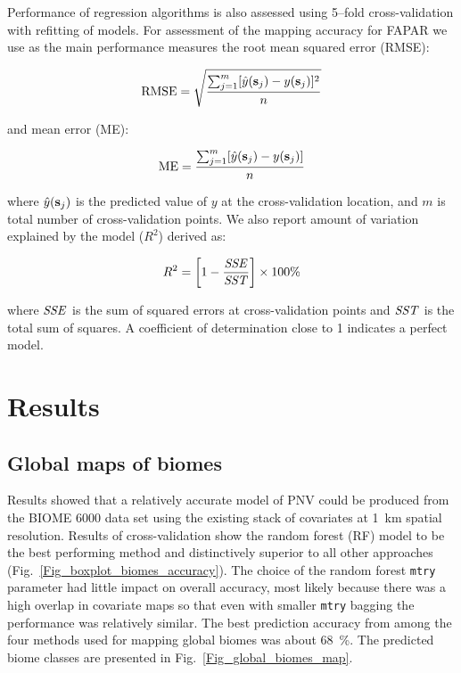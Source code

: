 \documentclass[fleqn,10pt,lineno]{wlpeerj} %
\begin{document}
Performance of regression algorithms is also assessed using 5--fold cross-validation with refitting of models. For assessment of the mapping accuracy for FAPAR we use as the main performance measures the root mean squared error (RMSE): 

\begin{equation} \label{E:RMSE}
{\rm RMSE} = \sqrt{\frac{ \sum_{j=1}^{m} [\hat y ({\bf s}_j) - y ({\bf s}_j)]^2 }{n}}
\end{equation}

\noindent and mean error (ME): 

\begin{equation} \label{E:ME}
{\rm ME} = \frac{\sum_{j=1}^{m} [\hat y ({\bf s}_j) - y ({\bf s}_j)]}{n} 
\end{equation}

\noindent where $\hat y ({\bf s}_j)$ is the predicted value of $y$ at the cross-validation location, and $m$ is total number of cross-validation points. We also report amount of variation explained by the model ($R^2$) derived as:

\begin{equation} \label{E:normvar}
 R^{2} = \left[ 1 - \frac{{\it{SSE}}}{{\it{SST}}} \right] \times 100\%
\end{equation}

\noindent where $\it{SSE}$ is the sum of squared errors at cross-validation points and $\it{SST}$ is the total sum of squares. A coefficient of determination close to 1 indicates a perfect model.\par

\section*{Results}

\subsection*{Global maps of biomes}

Results showed that a relatively accurate model of PNV could be produced from the BIOME 6000 data set using the existing stack of covariates at \SI{1}{\kilo\metre} spatial resolution. Results of cross-validation show the random forest (RF) model to be the best performing method and distinctively superior to all other approaches (Fig.\@~\ref{Fig_boxplot_biomes_accuracy}). The choice of the random forest \verb"mtry" parameter had little impact on overall accuracy, most likely because there was a high overlap in covariate maps so that even with smaller \verb"mtry" bagging the performance was relatively similar. The best prediction accuracy from among the four methods used for mapping global biomes was about \SI{68}{\percent}. The predicted biome classes are presented in Fig.\@~\ref{Fig_global_biomes_map}. \par 
\end{document}
